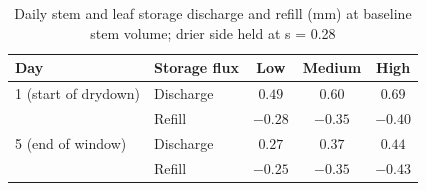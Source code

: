 \begin{table}[H]
\centering
\caption{Daily stem and leaf storage discharge and refill (mm) at baseline stem volume; drier side held at s = 0.28}
\label{tab:vwt_s2_one_daily_storage}
\begin{tabular}{llccc}
\hline
Day & Storage flux & Low & Medium & High \\
\hline
1 (start of drydown) & Discharge & $0.49$ & $0.60$ & $0.69$ \\
 & Refill & $-0.28$ & $-0.35$ & $-0.40$ \\
\hline
5 (end of window) & Discharge & $0.27$ & $0.37$ & $0.44$ \\
 & Refill & $-0.25$ & $-0.35$ & $-0.43$ \\
\hline
\end{tabular}
\end{table}
